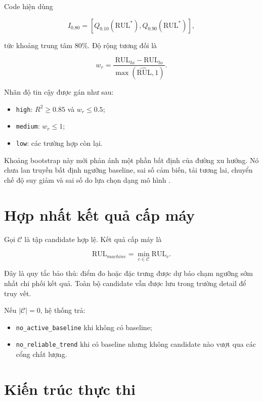 \documentclass[12pt,a4paper]{article}
\newcommand{\RUL}{\mathrm{RUL}}
\newcommand{\Rhat}{\widehat{\RUL}}
\newcommand{\Rtwo}{R^{2}}
\newcommand{\code}[1]{\texttt{#1}}
\newcommand{\status}[1]{\texttt{#1}}
\begin{document}
Code hiện dùng

\begin{equation}
  I_{0.80}=
  \left[Q_{0.10}(\RUL^*),Q_{0.90}(\RUL^*)\right],
  \label{eq:bootstrap-interval}
\end{equation}

tức khoảng trung tâm 80\%. Độ rộng tương đối là

\begin{equation}
  w_r=\frac{\RUL_{hi}-\RUL_{lo}}
  {\max(\Rhat,1)}.
\end{equation}

Nhãn độ tin cậy được gán như sau:

\begin{itemize}
  \item \code{high}: $\Rtwo\ge0.85$ và $w_r\le0.5$;
  \item \code{medium}: $w_r\le1$;
  \item \code{low}: các trường hợp còn lại.
\end{itemize}

Khoảng bootstrap này mới phản ánh một phần bất định của đường xu hướng. Nó chưa lan truyền bất định ngưỡng baseline, sai số cảm biến, tải tương lai, chuyển chế độ suy giảm và sai số do lựa chọn dạng mô hình \cite{sankararaman2013rul}.

\section{Hợp nhất kết quả cấp máy}

Gọi $\mathcal C$ là tập candidate hợp lệ. Kết quả cấp máy là

\begin{equation}
  \RUL_{machine}=\min_{c\in\mathcal C}\RUL_c.
  \label{eq:machine-rul}
\end{equation}

Đây là quy tắc bảo thủ: điểm đo hoặc đặc trưng được dự báo chạm ngưỡng sớm nhất chi phối kết quả. Toàn bộ candidate vẫn được lưu trong trường detail để truy vết.

Nếu $|\mathcal C|=0$, hệ thống trả:

\begin{itemize}
  \item \status{no\_active\_baseline} khi không có baseline;
  \item \status{no\_reliable\_trend} khi có baseline nhưng không candidate nào vượt qua các cổng chất lượng.
\end{itemize}

\section{Kiến trúc thực thi}
\end{document}
